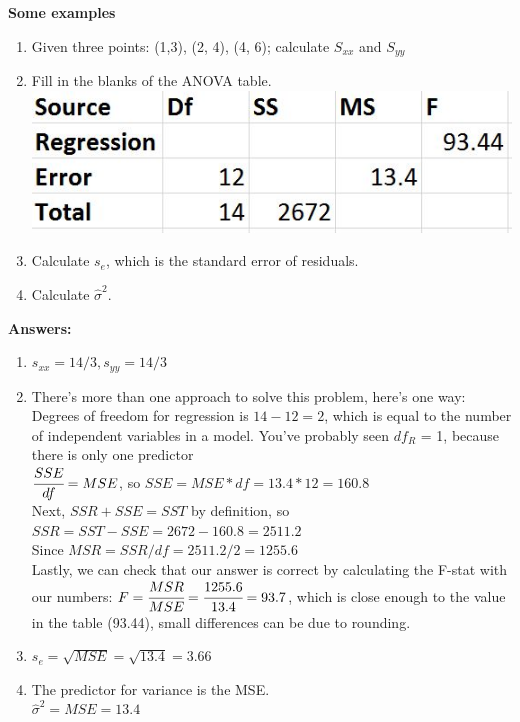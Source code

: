 \documentclass[12pt]{article}
\begin{document}
\noindent \textbf{Some examples} \\
\begin{enumerate}[noitemsep,topsep=0pt]
\item
Given three points: (1,3), (2, 4), (4, 6); calculate $S_{xx}$ and $S_{yy}$\\
\item
\noindent Fill in the blanks of the ANOVA table. \\

\includegraphics[]{blanktable.JPG}\\
\item
\noindent Calculate $s_{e}$, which is the standard error of residuals.\\
\item
Calculate $\hat{\sigma}^{2}.$
\end{enumerate}
\vspace{5mm}
\noindent \textbf{Answers:}
\begin{enumerate}
\item
$s_{xx} = 14/3, s_{yy} = 14/3$
\item 
There's more than one approach to solve this problem, here's one way:\\
Degrees of freedom for regression is $14 - 12 = 2$, which is equal to the number of independent variables in a model. You've probably seen $df_R$ = 1, because there is only one predictor \\
$\cfrac{SSE}{df} = MSE$, so $SSE = MSE *df = 13.4*12 = 160.8$\\
Next, $SSR+SSE=SST$ by definition, so $SSR = SST-SSE = 2672 - 160.8 = 2511.2$\\
Since $MSR=SSR/df = 2511.2/2 = 1255.6$\\
Lastly, we can check that our answer is correct by calculating the F-stat with our numbers: $F=\cfrac{MSR}{MSE}=\cfrac{1255.6}{13.4} = 93.7$, which is close enough to the value in the table (93.44), small differences can be due to rounding. 


\item
$s_{e}=\sqrt{MSE}=\sqrt{13.4}=3.66$
\item
The predictor for variance is the MSE.\\
$\hat{\sigma}^{2} = MSE = 13.4$
\end{enumerate}
\end{document}
